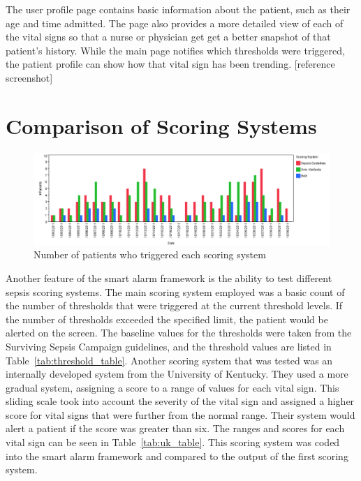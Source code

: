 \documentclass{sig-alternate}
\begin{document}
The user profile page contains basic information about the patient, such as their age and time admitted.  The page also provides a more detailed view of each of the vital signs so that a nurse or physician get get a better snapshot of that patient's history.  While the main page notifies which thresholds were triggered, the patient profile can show how that vital sign has been trending. [reference screenshot]

\section{Comparison of Scoring Systems}
\vspace{10pt}
\label{sec:scoring}

\begin{figure}
	\begin{center}
		\includegraphics[width=1.0\linewidth]{ScoringComparison.png}
	\end{center}
	\caption{Number of patients who triggered each scoring system}
	\label{fig:comparison}
\end{figure}

Another feature of the smart alarm framework is the ability to test different sepsis scoring systems.  The main scoring system employed was a basic count of the number of thresholds that were triggered at the current threshold levels.  If the number of thresholds exceeded the specified limit, the patient would be alerted on the screen.  The baseline values for the thresholds were taken from the Surviving Sepsis Campaign guidelines, and the threshold values are listed in Table~\ref{tab:threshold_table}.  Another scoring system that was tested was an internally developed system from the University of Kentucky.  They used a more gradual system, assigning a score to a range of values for each vital sign.  This sliding scale took into account the severity of the vital sign and assigned a higher score for vital signs that were further from the normal range.  Their system would alert a patient if the score was greater than six.  The ranges and scores for each vital sign can be seen in Table~\ref{tab:uk_table}.  This scoring system was coded into the smart alarm framework and compared to the output of the first scoring system.
\end{document}
